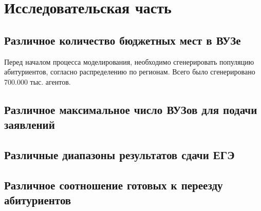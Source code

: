 \section{Исследовательская часть}

\subsection{Различное количество бюджетных мест в ВУЗе}

Перед началом процесса моделирования, необходимо сгенерировать популяцию абитуриентов, согласно распределению по регионам. Всего было сгенерировано 700.000 тыс. агентов.

\subsection{Различное максимальное число ВУЗов для подачи заявлений}

\subsection{Различные диапазоны результатов сдачи ЕГЭ}

\subsection{Различное соотношение готовых к переезду абитуриентов}

\pagebreak